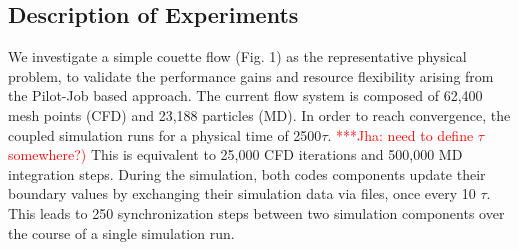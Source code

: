 \documentclass[conference,final]{IEEEtran}
\newcommand{\jhanote}[1]{ {\textcolor{red} { ***Jha: #1 }}}
\newcommand{\jhanote}[1]{}
\begin{document}

\subsection{Description of Experiments}

We investigate a simple couette flow (Fig. 1) as the representative
physical problem, to validate the performance gains and 
resource flexibility arising from the Pilot-Job based approach.
The current flow system is
composed of 62,400 mesh points (CFD) and 23,188 particles (MD).
In order to reach convergence, the coupled simulation runs for a
physical time of 2500$\tau$.  \jhanote{need to define $\tau$
  somewhere?)}  This is equivalent to 25,000 CFD iterations and
500,000 MD integration steps. During the simulation, both codes
components update their boundary values by exchanging their simulation
data via files, once every 10 $\tau$. This leads to 250
synchronization steps between two simulation components over
the course of a single simulation run.
\end{document}
